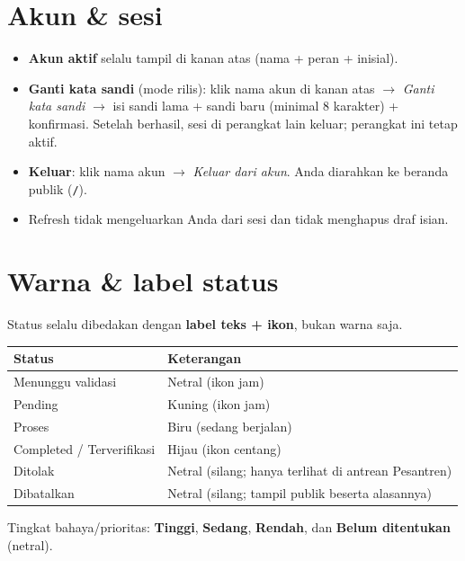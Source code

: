 \documentclass[11pt,a4paper]{article}
\newcommand{\code}[1]{\texttt{#1}}
\begin{document}
\section{Akun \& sesi}
\begin{itemize}
  \item \textbf{Akun aktif} selalu tampil di kanan atas (nama + peran + inisial).
  \item \textbf{Ganti kata sandi} (mode rilis): klik nama akun di kanan atas
        $\rightarrow$ \emph{Ganti kata sandi} $\rightarrow$ isi sandi lama + sandi
        baru (minimal 8 karakter) + konfirmasi. Setelah berhasil, sesi di perangkat
        lain keluar; perangkat ini tetap aktif.
  \item \textbf{Keluar}: klik nama akun $\rightarrow$ \emph{Keluar dari akun}.
        Anda diarahkan ke beranda publik (\code{/}).
  \item Refresh tidak mengeluarkan Anda dari sesi dan tidak menghapus draf isian.
\end{itemize}

\section{Warna \& label status}

Status selalu dibedakan dengan \textbf{label teks + ikon}, bukan warna saja.

\begin{center}
\begin{tabular}{@{}>{\raggedright\arraybackslash}p{4.2cm}>{\raggedright\arraybackslash}p{6.6cm}@{}}
\toprule
\textbf{Status} & \textbf{Keterangan} \\
\midrule
\cellcolor{headgrey}Menunggu validasi & Netral (ikon jam) \\
\cellcolor{yellow!25}Pending & Kuning (ikon jam) \\
\cellcolor{blue!15}Proses & Biru (sedang berjalan) \\
\cellcolor{green!15}Completed / Terverifikasi & Hijau (ikon centang) \\
\cellcolor{headgrey}Ditolak & Netral (silang; hanya terlihat di antrean Pesantren) \\
\cellcolor{headgrey}Dibatalkan & Netral (silang; tampil publik beserta alasannya) \\
\bottomrule
\end{tabular}
\end{center}

\noindent Tingkat bahaya/prioritas: \textcolor{red!70!black}{\textbf{Tinggi}},
\textcolor{orange!80!black}{\textbf{Sedang}},
\textcolor{green!50!black}{\textbf{Rendah}}, dan \textbf{Belum ditentukan} (netral).
\end{document}
